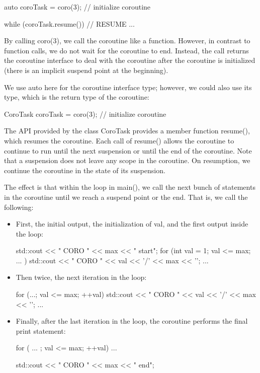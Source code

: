 \begin{cpp}
auto coroTask = coro(3); // initialize coroutine

while (coroTask.resume()) { // RESUME
	...
}
\end{cpp}

By calling coro(3), we call the coroutine like a function. However, in contrast to function calls, we do not wait for the coroutine to end. Instead, the call returns the coroutine interface to deal with the coroutine after the coroutine is initialized (there is an implicit suspend point at the beginning).

We use auto here for the coroutine interface type; however, we could also use its type, which is the return type of the coroutine:

\begin{cpp}
CoroTask coroTask = coro(3); // initialize coroutine
\end{cpp}

The API provided by the class CoroTask provides a member function resume(), which resumes the coroutine. Each call of resume() allows the coroutine to continue to run until the next suspension or until the end of the coroutine. Note that a suspension does not leave any scope in the coroutine. On resumption, we continue the coroutine in the state of its suspension.

The effect is that within the loop in main(), we call the next bunch of statements in the coroutine until we reach a suspend point or the end. That is, we call the following:

\begin{itemize}
\item 
First, the initial output, the initialization of val, and the first output inside the loop:

\begin{cpp}
std::cout << "                 CORO " << max << " start\n";
for (int val = 1; val <= max; ... ) {
	std::cout << "               CORO " << val << '/' << max << '\n';
	...
}
\end{cpp}

\item 
Then twice, the next iteration in the loop:

\begin{cpp}
	for (...; val <= max; ++val) {
		std::cout << "               CORO " << val << '/' << max << '\n';
		...
	}
\end{cpp}

\item 
Finally, after the last iteration in the loop, the coroutine performs the final print statement:

\begin{cpp}
for ( ... ; val <= max; ++val) {
	...
}

std::cout << " CORO " << max << " end\n";
\end{cpp}
\end{itemize}

